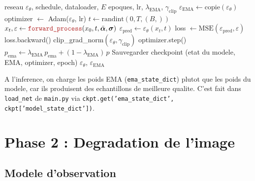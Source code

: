 \documentclass[12pt]{article}
\newcommand{\file}[1]{\texttt{\color{codeblue}#1}}
\newcommand{\func}[1]{\texttt{\color{codered}#1}}
\newcommand{\var}[1]{\texttt{\color{codegreen}#1}}
\begin{document}
\begin{algorithm}[H]
\caption{Boucle d'entrainement --- \file{Training.py} $\to$ \func{train}}
\begin{algorithmic}[1]
\Require reseau $\varepsilon_\theta$, schedule, dataloader, $E$ epoques, lr, $\lambda_{\text{EMA}}$, $\gamma_{\text{clip}}$
\State $\varepsilon_{\text{EMA}} \gets \text{copie}(\varepsilon_\theta)$ 
\State optimizer $\gets$ Adam($\varepsilon_\theta$, lr)
    
    \State $t \gets \text{randint}(0, T, (B,))$ 
    \State $x_t, \varepsilon \gets \func{forward\_process}(x_0, t, \bar{\boldsymbol{\alpha}}, \boldsymbol{\sigma})$ 
    \State $\varepsilon_{\text{pred}} \gets \varepsilon_\theta(x_t, t)$
    \State loss $\gets \text{MSE}(\varepsilon_{\text{pred}}, \varepsilon)$ 
    \State loss.backward()
    \State clip\_grad\_norm$(\varepsilon_\theta, \gamma_{\text{clip}})$
    \State optimizer.step()
     
      \State $p_{\text{ema}} \gets \lambda_{\text{EMA}}\, p_{\text{ema}} + (1-\lambda_{\text{EMA}})\, p$
    \EndFor
  \EndFor
  \State Sauvegarder checkpoint (etat du modele, EMA, optimizer, epoch)
\EndFor
\Ensure $\varepsilon_\theta$, $\varepsilon_{\text{EMA}}$
\end{algorithmic}
\end{algorithm}

\begin{remarkbox}
A l'inference, on charge les poids EMA (\var{ema\_state\_dict}) plutot que les poids du modele, car ils produisent des echantillons de meilleure qualite. C'est fait dans \func{load\_net} de \file{main.py} via \texttt{ckpt.get('ema\_state\_dict', ckpt['model\_state\_dict'])}.
\end{remarkbox}

\section{Phase 2 : Degradation de l'image}

\subsection{Modele d'observation}
\end{document}
